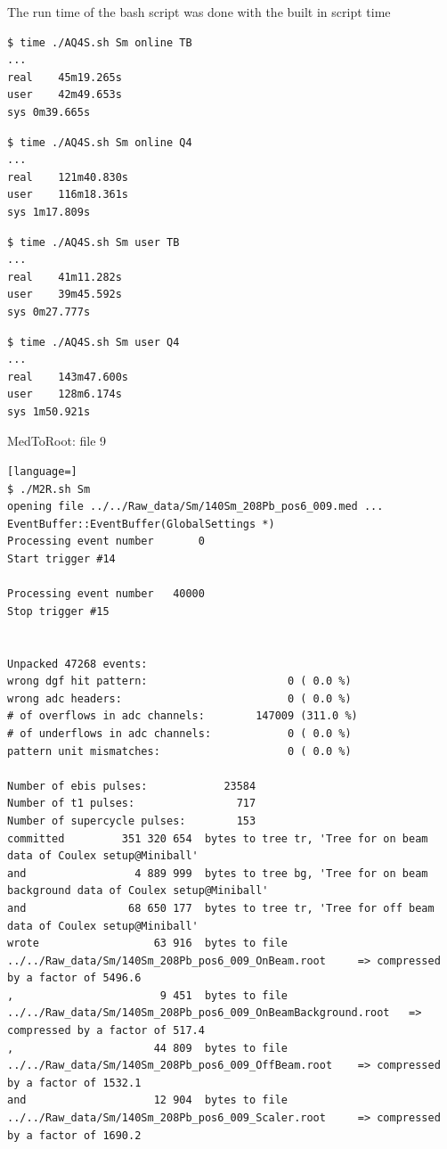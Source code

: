 \documentclass[twoside,english]{uiofysmaster/uiofysmaster}
\begin{document}
The run time of the bash script was done with the built in script time

\begin{lstlisting}[language=sh]
$ time ./AQ4S.sh Sm online TB
...
real	45m19.265s
user	42m49.653s
sys	0m39.665s
\end{lstlisting}


\begin{lstlisting}[language=sh]
$ time ./AQ4S.sh Sm online Q4
...
real	121m40.830s
user	116m18.361s
sys	1m17.809s
\end{lstlisting}


\begin{lstlisting}[language=sh]
$ time ./AQ4S.sh Sm user TB
...
real	41m11.282s
user	39m45.592s
sys	0m27.777s
\end{lstlisting}


\begin{lstlisting}[language=sh]
$ time ./AQ4S.sh Sm user Q4
...
real	143m47.600s
user	128m6.174s
sys	1m50.921s
\end{lstlisting}

\bigskip

MedToRoot: file 9
\begin{lstlisting}[language=] 
$ ./M2R.sh Sm
opening file ../../Raw_data/Sm/140Sm_208Pb_pos6_009.med ...
EventBuffer::EventBuffer(GlobalSettings *)
Processing event number       0
Start trigger #14

Processing event number   40000
Stop trigger #15


Unpacked 47268 events:
wrong dgf hit pattern:                      0 ( 0.0 %)
wrong adc headers:                          0 ( 0.0 %)
# of overflows in adc channels:        147009 (311.0 %)
# of underflows in adc channels:            0 ( 0.0 %)
pattern unit mismatches:                    0 ( 0.0 %)

Number of ebis pulses:            23584
Number of t1 pulses:                717
Number of supercycle pulses:        153
committed         351 320 654  bytes to tree tr, 'Tree for on beam data of Coulex setup@Miniball'
and                 4 889 999  bytes to tree bg, 'Tree for on beam background data of Coulex setup@Miniball'
and                68 650 177  bytes to tree tr, 'Tree for off beam data of Coulex setup@Miniball'
wrote                  63 916  bytes to file ../../Raw_data/Sm/140Sm_208Pb_pos6_009_OnBeam.root 	=> compressed by a factor of 5496.6
,                       9 451  bytes to file ../../Raw_data/Sm/140Sm_208Pb_pos6_009_OnBeamBackground.root 	=> compressed by a factor of 517.4
,                      44 809  bytes to file ../../Raw_data/Sm/140Sm_208Pb_pos6_009_OffBeam.root 	=> compressed by a factor of 1532.1
and                    12 904  bytes to file ../../Raw_data/Sm/140Sm_208Pb_pos6_009_Scaler.root 	=> compressed by a factor of 1690.2
\end{lstlisting}
\end{document}
